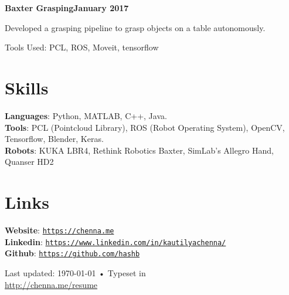 \documentclass[letterpaper, margin, line]{resume}
\begin{document}
\begin{resume}
	\textbf{Baxter Grasping}\hfill \textbf{January 2017}
	\begin{list2}
		\item Developed a grasping pipeline to grasp objects on a table autonomously.
		\item Tools Used: PCL, ROS, Moveit, tensorflow
	\end{list2}\vspace{-1.5mm}
		


    \section{\mysidestyle Skills} 

    \textbf{Languages}: Python, MATLAB, C++, Java. \\[1mm]
    \textbf{Tools}: PCL (Pointcloud Library), ROS (Robot Operating System), OpenCV, Tensorflow, Blender, Keras. \\[1mm]
    \textbf{Robots}: KUKA LBR4, Rethink Robotics Baxter, SimLab's Allegro Hand, Quanser HD2
    
    
    \section{\mysidestyle Links}
	\textbf{Website}: \texttt{\href{https://chenna.me}{https://chenna.me}} \\[1mm]
    \textbf{Linkedin}: \texttt{\href{https://www.linkedin.com/in/kautilyachenna/}{https://www.linkedin.com/in/kautilyachenna/}}\\[1mm]
    \textbf{Github}: \texttt{\href{https://github.com/hashb}{https://github.com/hashb}}
    

\begin{center}
	{\scriptsize  Last updated: \today\- •\- Typeset in \href{}{
			\XeTeX }\\
		\href{http://chenna.me/resume}{http://chenna.me/resume}}
\end{center}

\end{resume}
\end{document}
